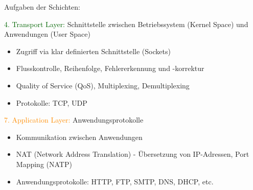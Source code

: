 \begin{KR}{Aufgaben der Schichten:}
\begin{itemize}
    \end{itemize}
    \textcolor{darkgreen}{4. Transport Layer:} Schnittstelle zwischen Betriebssystem (Kernel Space) und Anwendungen (User Space)
    \begin{itemize}
        \item Zugriff via klar definierten Schnittstelle (Sockets)
        \item Flusskontrolle, Reihenfolge, Fehlererkennung und -korrektur
        \item Quality of Service (QoS), Multiplexing, Demultiplexing
        \item Protokolle: TCP, UDP
    \end{itemize}
    \textcolor{darkorange}{7. Application Layer:} Anwendungsprotokolle 
    \begin{itemize}
        \item Kommunikation zwischen Anwendungen
        \item NAT (Network Address Translation) - Übersetzung von IP-Adressen, Port Mapping (NATP)
        \item Anwendungsprotokolle: HTTP, FTP, SMTP, DNS, DHCP, etc.
    \end{itemize}
\end{KR}




 
    
 